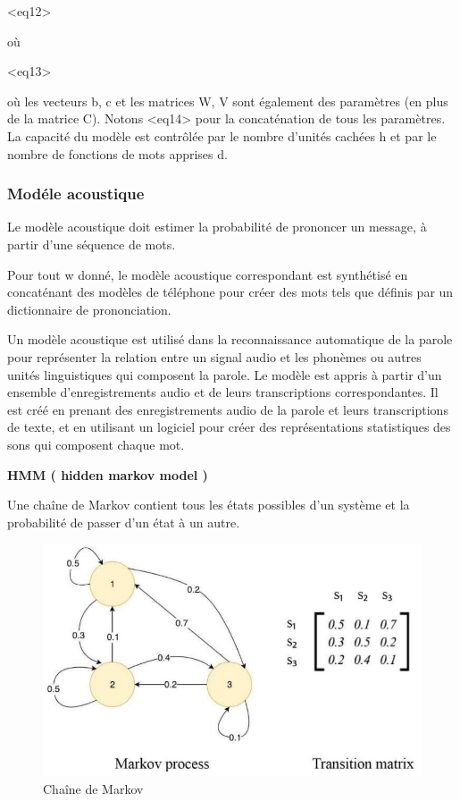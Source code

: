 \documentclass[a4paper, 12pt]{book}
\begin{document}
<eq12>

où

<eq13>

où les vecteurs b, c et les matrices W, V sont également des paramètres (en plus de la matrice C). Notons <eq14>  pour la concaténation de tous les paramètres. La capacité du modèle est contrôlée par le nombre d'unités cachées h et par le nombre de fonctions de mots apprises d.

\subsubsection{Modéle acoustique}

Le modèle acoustique doit estimer la probabilité de prononcer un message, à partir d'une séquence de mots.

Pour tout w donné, le modèle acoustique correspondant est synthétisé en concaténant des modèles de téléphone pour créer des mots tels que définis par un dictionnaire de prononciation.

Un modèle acoustique est utilisé dans la reconnaissance automatique de la parole pour représenter la relation entre un signal audio et les phonèmes ou autres unités linguistiques qui composent la parole. Le modèle est appris à partir d'un ensemble d'enregistrements audio et de leurs transcriptions correspondantes. Il est créé en prenant des enregistrements audio de la parole et leurs transcriptions de texte, et en utilisant un logiciel pour créer des représentations statistiques des sons qui composent chaque mot.

\textbf{HMM ( hidden markov model )}

Une chaîne de Markov contient tous les états possibles d'un système et la probabilité de passer d'un état à un autre.

\begin{figure}[htbp]
  \centering
  \includegraphics[width=0.7\linewidth]{fig/markov.png}
  \caption{Chaîne de Markov}
\end{figure}
\end{document}
